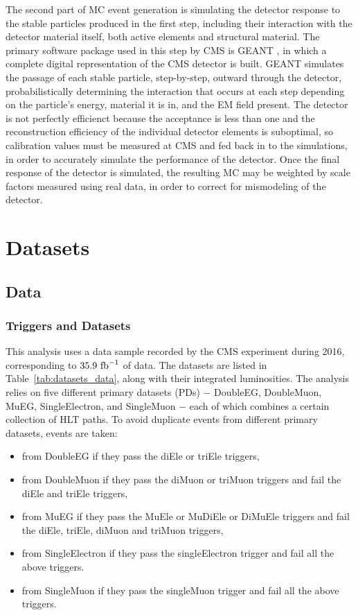 \indent The second part of MC event generation is simulating the detector response to the stable particles produced in the first step, including their interaction with the detector material itself, both active elements and structural material. The primary software package used in this step by CMS is GEANT \cite{documents:998155}, in which a complete digital representation of the CMS detector is built. GEANT simulates the passage of each stable particle, step-by-step, outward through the detector, probabilistically determining the interaction that occurs at each step depending on the particle's energy,  material it is in, and the EM field present. The detector is not perfectly efficienct because the acceptance is less than one and the reconstruction efficiency of the individual detector elements is suboptimal, so calibration values must be measured at CMS and fed back in to the simulations, in order to accurately simulate the performance of the detector. Once the final response of the detector is simulated, the resulting MC may be weighted by scale factors measured using real data, in order to correct for mismodeling of the detector.

\section{Datasets}

\subsection{Data}

\subsubsection{Triggers and Datasets}
\label{sec:trigpaths}

This analysis uses a data sample recorded by the CMS experiment during 2016, corresponding to $35.9\rm{\ fb}^{-1}$ of data. 
The datasets are listed in Table~\ref{tab:datasets_data}, along with their integrated luminosities.  
The analysis relies on five different primary datasets (PDs) $-$ 
DoubleEG, DoubleMuon, MuEG, SingleElectron, and SingleMuon $-$
each of which combines a certain collection of HLT paths. 
To avoid duplicate events from different primary datasets, events are taken:
\begin{itemize}
\item from DoubleEG if they pass the diEle or triEle triggers,
\item from DoubleMuon if they pass the diMuon or triMuon triggers and fail the diEle and triEle triggers,
\item from MuEG if they pass the MuEle or MuDiEle or DiMuEle triggers and fail the diEle, triEle, diMuon and triMuon triggers,
\item from SingleElectron if they pass the singleElectron trigger and fail all the above triggers. 
\item from SingleMuon if they pass the singleMuon trigger and fail all the above triggers. 
\end{itemize} 

